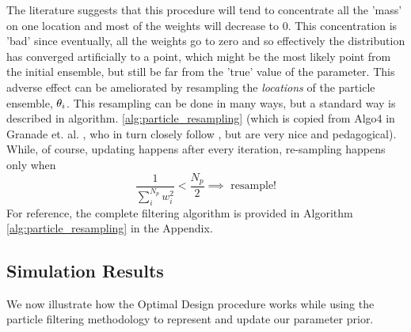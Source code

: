 The literature suggests that this procedure will tend to concentrate all the
'mass' on one location and most of the weights will decrease to 0. This
concentration is 'bad' since eventually, all the weights go to zero and so
effectively the distribution has converged  artificially to a point, which might
be the most likely point from the initial ensemble, but still be far from the
'true' value of the parameter. This adverse effect can be ameliorated by
resampling the {\sl locations} of the particle ensemble, ${ \theta}_i$. This
resampling can be done in many ways, but a standard way is described in
algorithm. \ref{alg:particle_resampling} (which is copied from Algo4 in Granade
et. al. \cite{Granade2012}, who in turn closely follow \cite{Liu2001}, but
are very nice and pedagogical).
While, of course, updating happens after every iteration, re-sampling happens
only when  
$$ \frac{1}{\sum_i^{N_p} w_i^2} < \frac {N_p}{2} \implies \textrm{ resample!}$$
For reference, the complete filtering algorithm is provided in 
Algorithm \ref{alg:particle_resampling} in the Appendix.



% 


\subsection{Simulation Results}
We now illustrate how the Optimal Design procedure works while using the
particle filtering methodology to represent and update our parameter prior.


